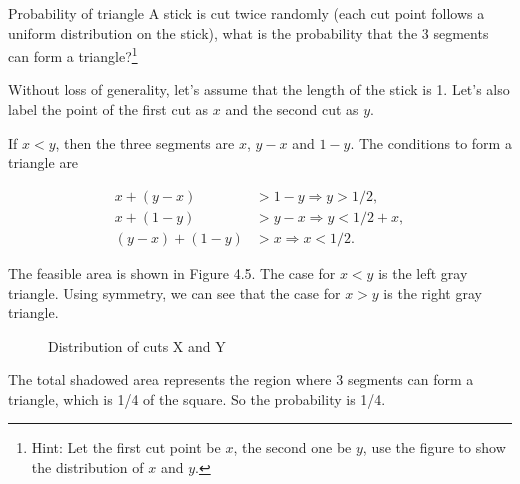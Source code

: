 \begin{problem}{Probability of triangle}
A stick is cut twice randomly (each cut point follows a uniform distribution on the stick),
what is the probability that the 3 segments can form a triangle?\footnote[22]{Hint: Let the
first cut point be $x$, the second one be $y$, use the figure to show the distribution of $x$
and $y$.}
\end{problem}
\begin{solution}
Without loss of generality, let's assume that the length of the stick is 1. Let's
also label the point of the first cut as $x$ and the second cut as $y$.

If $x<y$, then the three segments are $x$, $y-x$ and $1-y$. The conditions to form a
triangle are

\begin{center}
\end{center}

\begin{align*}
x+(y-x)&>1-y \Rightarrow y>1/2,\\
x+(1-y)&>y-x \Rightarrow y<1/2+x,\\
(y-x)+(1-y)&>x \Rightarrow x<1/2.
\end{align*}

The feasible area is shown in Figure 4.5. The case for $x<y$ is the left gray
triangle. Using symmetry, we can see that the case for $x>y$ is the right gray
triangle.

\begin{figure}[ht]
\centering
{}
\caption{Distribution of cuts X and Y}
\label{fig:zhou-figure-4-5}
\end{figure}


The total shadowed area represents the region where 3 segments can form a triangle,
which is 1/4 of the square. So the probability is 1/4.
\end{solution}

